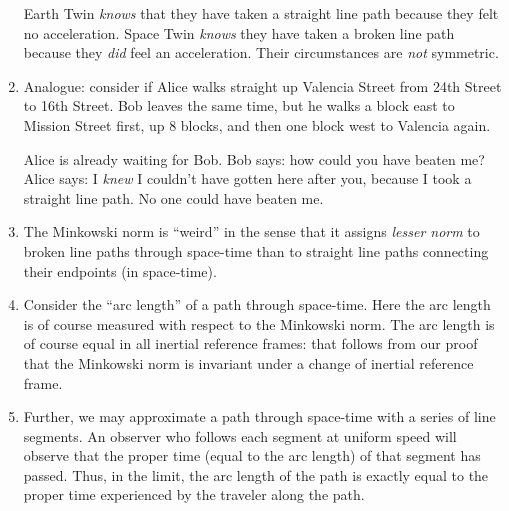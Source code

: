 \begin{enumerate}
  Earth Twin \emph{knows} that they have taken a straight line path
  because they felt no acceleration. Space Twin \emph{knows} they have
  taken a broken line path because they \emph{did} feel an acceleration.
  Their circumstances are \emph{not} symmetric.

  \item Analogue: consider if Alice walks straight up Valencia Street
  from 24th Street to 16th Street. Bob leaves the same time, but he
  walks a block east to Mission Street first, up 8 blocks, and then one
  block west to Valencia again.

  Alice is already waiting for Bob. Bob says: how could you have beaten
  me? Alice says: I \emph{knew} I couldn't have gotten here after you,
  because I took a straight line path. No one could have beaten me.

  \item The Minkowski norm is ``weird'' in the sense that it assigns
  \emph{lesser norm} to broken line paths through space-time than to
  straight line paths connecting their endpoints (in space-time).

  \item Consider the ``arc length'' of a path through space-time. Here
  the arc length is of course measured with respect to the Minkowski
  norm. The arc length is of course equal in all inertial reference
  frames: that follows from our proof that the Minkowski norm is
  invariant under a change of inertial reference frame.

  \item Further, we may approximate a path through space-time with a
  series of line segments. An observer who follows each segment at
  uniform speed will observe that the proper time (equal to the arc
  length) of that segment has passed. Thus, in the limit, the arc length
  of the path is exactly equal to the proper time experienced by the
  traveler along the path.

\end{enumerate}
